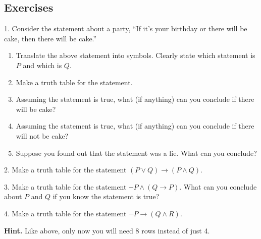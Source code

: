 \documentclass[12pt,]{book}
\theoremstyle{plain}
\theoremstyle{definition}
\theoremstyle{definition}
\theoremstyle{definition}
\numberwithin{equation}{chapter}
\newcommand{\imp}{\rightarrow}
\begin{document}
\subsection*{Exercises}\label{exercises_sec-logic}
\begin{exerciselist}
\item[1.]\hypertarget{exercise-141}{}\hypertarget{p-1259}{}%
Consider the statement about a party, ``If it's your birthday or there will be cake, then there will be cake.''%
\par
\hypertarget{p-1260}{}%
\leavevmode%
\begin{enumerate}[label=(\alph*)]
\item\hypertarget{li-613}{}\hypertarget{p-1261}{}%
Translate the above statement into symbols. Clearly state which statement is \(P\) and which is \(Q\).%
\item\hypertarget{li-614}{}\hypertarget{p-1262}{}%
Make a truth table for the statement.%
\item\hypertarget{li-615}{}\hypertarget{p-1263}{}%
Assuming the statement is true, what (if anything) can you conclude if there will be cake?%
\item\hypertarget{li-616}{}\hypertarget{p-1264}{}%
Assuming the statement is true, what (if anything) can you conclude if there will not be cake?%
\item\hypertarget{li-617}{}\hypertarget{p-1265}{}%
Suppose you found out that the statement was a lie. What can you conclude?%
\end{enumerate}
%
\par\smallskip
\item[2.]\hypertarget{exercise-142}{}\hypertarget{p-1271}{}%
Make a truth table for the statement \((P \vee Q) \imp (P \wedge Q)\).%
\par\smallskip
\item[3.]\hypertarget{exercise-143}{}\hypertarget{p-1272}{}%
Make a truth table for the statement \(\neg P \wedge (Q \imp P)\). What can you conclude about \(P\) and \(Q\) if you know the statement is true?%
\par\smallskip
\item[4.]\hypertarget{exercise-144}{}\hypertarget{p-1274}{}%
Make a truth table for the statement \(\neg P \imp (Q \wedge R)\).%
\par\smallskip
\par\smallskip%
\noindent\textbf{Hint.}\hypertarget{hint-9}{}\quad%
\hypertarget{p-1275}{}%
Like above, only now you will need 8 rows instead of just 4.%

\end{exerciselist}
\end{document}
